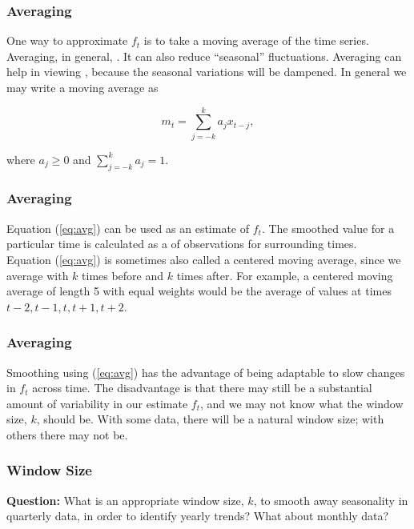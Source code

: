 \documentclass[%
xcolor=pdftex]{beamer}
\begin{document}
\begin{frame}
\frametitle{Averaging}

One way to approximate $f_t$ is to take a moving average of the time series.  Averaging, in general, \underline{\hspace{30 mm}}.  It can also reduce ``seasonal'' fluctuations. Averaging can help in viewing \underline{\hspace{30 mm}}, because the seasonal variations will be dampened.  In general we may write a moving average as

\begin{equation} \label{eq:avg}
m_t=\sum_{j=-k}^{k} a_j x_{t-j},
\end{equation}

where $a_j \geq 0$ and $\sum_{j=-k}^k a_j = 1$.

\end{frame}

\begin{frame}
\frametitle{Averaging}

Equation (\ref{eq:avg}) can be used as an estimate of $f_t$. The smoothed value for a particular time is calculated as a \underline{\hspace{30 mm}} of observations for surrounding times. \\
\vspace{5mm}
Equation (\ref{eq:avg}) is sometimes also called a centered moving average, since we average with $k$ times before and $k$ times after. For example, a centered moving average of length 5 with equal weights would be the average of values at times $t-2, t-1, t, t+1, t+2$.

\end{frame}

\begin{frame}
\frametitle{Averaging}

Smoothing using (\ref{eq:avg}) has the advantage of being adaptable to slow changes in $f_t$ across time.  The disadvantage is that there may still be a substantial amount of variability in our estimate $f_t$, and we may not know \underline{\hspace{15 mm}} what the window size, $k$, should be.  With some data, there will be a natural window size; with others there may not be.

\end{frame}

\begin{frame}
\frametitle{Window Size}

\textbf{Question:} What is an appropriate window size, $k$, to smooth away seasonality in quarterly data, in order to identify yearly trends? What about monthly data? 


\vspace{50mm}



\end{frame}
\end{document}
